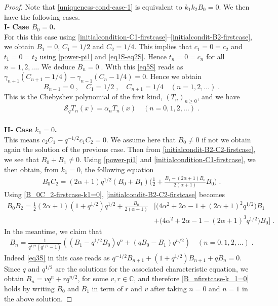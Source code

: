 \documentclass{amsart}
\theoremstyle{remark}
\numberwithin{equation}{section}
\begin{document}
\begin{proof}
Note that \eqref{uniqueness-cond-case-1} is equivalent to $k_1k_2B_0= 0$. We then have the following cases.\\
\textbf{I- }{\bf Case $B_0=0$.}\\
For this this case using \eqref{initialcondition-C1-firstcase}--\eqref{initialcondit-B2-firstcase}, we obtain $B_1=0$, $C_1=1/2$ and $C_2=1/4$. This implies that $c_1=0=c_2$ and $t_1=0=t_2$ using \eqref{power-pi1} and \eqref{eq1S-eq2S}. Hence $t_n=0=c_n$ for all $n=1,2,\ldots$. We deduce $B_n=0\;.$
With this \eqref{eq5S} reads as $ \gamma_{n+1}(C_{n+1}-1/4) -\gamma_{n-1}(C_n-1/4)=0$. Hence we obtain
$$B_{n-1}=0\;,\quad C_1=1/2\;,\quad C_{n+1}=1/4 \quad (n=1,2,\ldots)\;.$$ 
This is the Chebyshev polynomial of the first kind, $(T_n)_{n\geq 0}$, and we have 
\begin{align}
\mathcal{S}_qT_n(x)=\alpha_nT_n(x)\quad (n=0,1,2,\ldots)\;.\label{full-equation-chebyshev-case1}
\end{align}
\\
\textbf{II- }{\bf Case $k_1=0$.}\\
This means $c_2C_1-q^{-1/2}c_1C_2=0$. We assume here that $B_0\neq 0$ if not we obtain again the solution of the previous case. Then from \eqref{initialcondit-B2-C2-firstcase}, we see that $B_0+B_1\neq 0$. Using \eqref{power-pi1} and \eqref{initialcondition-C1-firstcase}, we then obtain, from $k_1=0$, the following equation
\begin{align}\label{B_0C_2-firstcase-k1=0}
B_0C_2= (2\alpha+1)q^{1/2}(B_0+B_1)\Big(\frac{1}{2}+\frac{B_1-(2\alpha+1)B_0}{2(\alpha+1)}B_0  \Big)\;.
\end{align}
Using \eqref{B_0C_2-firstcase-k1=0}, \eqref{initialcondit-B2-C2-firstcase} becomes
\begin{align}\label{B_0B_2-firstcase-k_1=0}
B_0B_2 =\frac{1}{2}(2\alpha+1)(1+q^{1/2})q^{1/2}+\frac{B_0}{2(\alpha+1)}&\Big[ \big(4\alpha^2+2\alpha-1+(2\alpha+1)^2q^{1/2} \big)B_1    \\
&+\big(4\alpha^2+2\alpha-1-(2\alpha+1)^3q^{1/2} \big)B_0  \Big]\;.\nonumber
\end{align}
In the meantime, we claim that 
\begin{align}\label{B_nfirstcase-k_1=0}
B_n=\frac{1}{q^{1/2}(q^{1/2}-1)}\left((B_1-q^{1/2}B_0)q^n +(qB_0-B_1)q^{n/2}  \right)\quad (n=0,1,2,\ldots)\;.
\end{align}
Indeed \eqref{eq3S} in this case reads as $q^{-1/2}B_{n+1}+(1+q^{1/2})B_{n+1}+qB_n=0$. Since $q$ and $q^{1/2}$ are the solutions for the associated characteristic equation, we obtain $B_n=vq^n +rq^{n/2}$, for some $v,r\in \mathbb{C}$, and therefore \eqref{B_nfirstcase-k_1=0} holds by writing $B_0$ and $B_1$ in term of $r$ and $v$ after taking $n=0$ and $n=1$ in the above solution.   


\end{proof}
\end{document}
